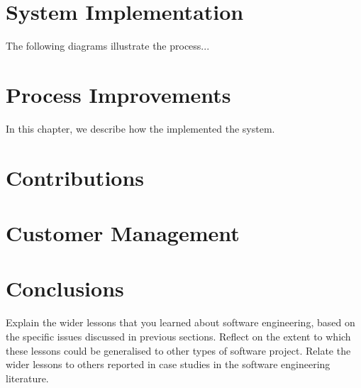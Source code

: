 \documentclass{l3proj}
\begin{document}

\begin{comment}
 I have some areas that we could consider:

  - team dynamics throughout the project
  - estimations of customer goals/customer management
  - improvements made over time
  - contributions

\end{comment}




\section{System Implementation}
\label{design}

The following diagrams illustrate the
process...

\section{Process Improvements}
\label{managing}

In this chapter, we describe how the implemented the system.

\section{Contributions}



\section{Customer Management}
\label{sec:managing}


\section{Conclusions}

Explain the wider lessons that you learned about software engineering,
based on the specific issues discussed in previous sections.  Reflect
on the extent to which these lessons could be generalised to other
types of software project.  Relate the wider lessons to others
reported in case studies in the software engineering literature.



\end{document}
